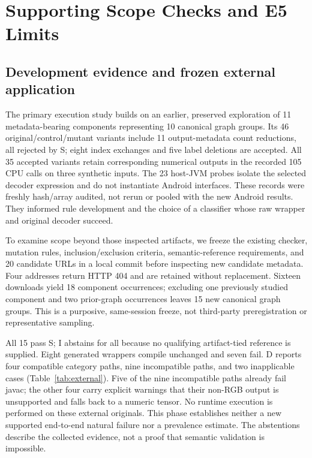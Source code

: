 \documentclass[10pt,twocolumn,letterpaper]{article}
\begin{document}
\section{Supporting Scope Checks and E5 Limits}
\label{sec:scope}
\subsection{Development evidence and frozen external application}
The primary execution study builds on an earlier, preserved exploration of 11 metadata-bearing components representing 10 canonical graph groups. Its 46 original/control/mutant variants include 11 output-metadata count reductions, all rejected by S; eight index exchanges and five label deletions are accepted. All 35 accepted variants retain corresponding numerical outputs in the recorded 105 CPU calls on three synthetic inputs. The 23 host-JVM probes isolate the selected decoder expression and do not instantiate Android interfaces. These records were freshly hash/array audited, not rerun or pooled with the new Android results. They informed rule development and the choice of a classifier whose raw wrapper and original decoder succeed.

To examine scope beyond those inspected artifacts, we freeze the existing checker, mutation rules, inclusion/exclusion criteria, semantic-reference requirements, and 20 candidate URLs in a local commit before inspecting new candidate metadata. Four addresses return HTTP 404 and are retained without replacement. Sixteen downloads yield 18 component occurrences; excluding one previously studied component and two prior-graph occurrences leaves 15 new canonical graph groups. This is a purposive, same-session freeze, not third-party preregistration or representative sampling.

All 15 pass S; I abstains for all because no qualifying artifact-tied reference is supplied. Eight generated wrappers compile unchanged and seven fail. D reports four compatible category paths, nine incompatible paths, and two inapplicable cases (Table~\ref{tab:external}). Five of the nine incompatible paths already fail javac; the other four carry explicit warnings that their non-RGB output is unsupported and falls back to a numeric tensor. No runtime execution is performed on these external originals. This phase establishes neither a new supported end-to-end natural failure nor a prevalence estimate. The abstentions describe the collected evidence, not a proof that semantic validation is impossible.
\end{document}
